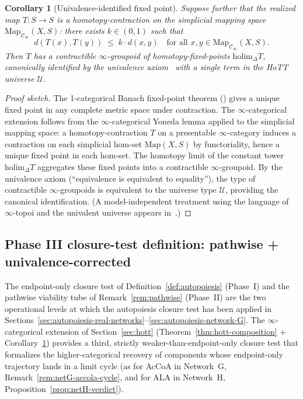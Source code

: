 \documentclass[11pt,a4paper]{article}
\theoremstyle{plain}
\newtheorem{corollary}[theorem]{Corollary}
\theoremstyle{definition}
\theoremstyle{remark}
\begin{document}
\begin{corollary}[Univalence-identified fixed point]
\label{cor:hott-fixedpoint}
Suppose further that the realized map $T : S \to S$ is a
homotopy-contraction on the simplicial mapping space
$\mathrm{Map}_{\mathcal{C}_\infty}(X, S)$: there exists $k \in (0,1)$
such that
\[
d(T(x), T(y)) \;\leq\; k \cdot d(x, y)
\quad \text{for all } x, y \in \mathrm{Map}_{\mathcal{C}_\infty}(X, S).
\]
Then $T$ has a contractible $\infty$-groupoid of homotopy-fixed-points
$\mathrm{holim}_\Delta T$, canonically identified by the univalence
axiom~\cite[\S 2.9--2.10]{hottbook2013} with a single term in the
HoTT universe $\mathcal{U}$.
\end{corollary}

\begin{proof}[Proof sketch]
The 1-categorical Banach fixed-point theorem (\cite{banach1922}) gives
a unique fixed point in any complete metric space under contraction.
The $\infty$-categorical extension follows from the $\infty$-categorical
Yoneda lemma applied to the simplicial mapping space: a
homotopy-contraction $T$ on a presentable $\infty$-category induces a
contraction on each simplicial hom-set $\mathrm{Map}(X, S)$ by functoriality,
hence a unique fixed point in each hom-set. The homotopy limit of the
constant tower $\mathrm{holim}_\Delta T$ aggregates these fixed points
into a contractible $\infty$-groupoid. By the univalence axiom
(``equivalence is equivalent to equality''), the type of contractible
$\infty$-groupoids is equivalent to the universe type $\mathcal{U}$,
providing the canonical identification. (A model-independent treatment
using the language of $\infty$-topoi and the univalent universe appears
in~\cite{cisinski2019}.)
\end{proof}

\subsection{Phase III closure-test definition: pathwise + univalence-corrected}
\label{sec:phase3}

The endpoint-only closure test of Definition~\ref{def:autopoiesis} (Phase~I)
and the pathwise viability tube of Remark~\ref{rem:pathwise} (Phase~II) are
the two operational levels at which the autopoiesis closure test has been
applied in Sections~\ref{sec:autopoiesis-real-networks}--\ref{sec:autopoiesis-network-G}.
The $\infty$-categorical extension of Section~\ref{sec:hott} (Theorem~\ref{thm:hott-composition}
+ Corollary~\ref{cor:hott-fixedpoint}) provides a third, strictly
weaker-than-endpoint-only closure test that formalizes the higher-categorical
recovery of components whose endpoint-only trajectory lands in a limit
cycle (as for AcCoA in Network~G, Remark~\ref{rem:netG-accola-cycle}, and
for ALA in Network~H, Proposition~\ref{prop:netH-verdict}).
\end{document}
